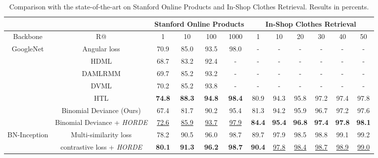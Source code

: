 \documentclass[10pt,twocolumn,letterpaper]{article}
\def\ourmethod{\textit{HORDE}}
\begin{document}
    \setlength{\tabcolsep}{7pt}
    \begin{table*}[t!]
        \footnotesize
        \begin{center}
            \begin{tabular}{|c|c|cccc|cccccc|}\hline
                 & & \multicolumn{4}{c|}{Stanford Online Products} & \multicolumn{6}{c|}{In-Shop Clothes Retrieval} \\\hline
                Backbone & R@ & 1 & 10 & 100 & 1000 & 1 & 10 & 20 & 30 & 40 & 50 \\\hline
\multirow{7}{*}{GoogleNet} & Angular loss \cite{Wang_2017_ICCV} & 70.9 & 85.0 & 93.5 & 98.0 & - & - & - & - & - & - \\
                & HDML \cite{Zheng_2019_CVPR} & 68.7 & 83.2 & 92.4 & - & - & - & - & - & - & - \\
                & DAMLRMM \cite{Xu_2019_CVPR} & 69.7 & 85.2 & 93.2 & - & - & - & - & - & - & - \\
                & DVML \cite{Lin_2018_ECCV} & 70.2 & 85.2 & 93.8 & - & - & - & - & - & - & - \\
& HTL \cite{Ge_2018_ECCV} & \textbf{74.8} & \textbf{88.3} & \textbf{94.8} & \textbf{98.4} & 80.9 & 94.3 & 95.8 & 97.2 & 97.4 & 97.8\\
                \cline{2-12}
& Binomial Deviance (Ours) & 67.4 & 81.7 & 90.2 & 95.4 & 81.3 & 94.2 & 95.9 & 96.7 & 97.2 & 97.6 \\
                & Binomial Deviance + \ourmethod & \underline{72.6} & \underline{85.9} & \underline{93.7} & \underline{97.9} & \textbf{84.4} & \textbf{95.4} & \textbf{96.8} & \textbf{97.4} & \textbf{97.8} & \textbf{98.1} \\
                \hline
                \multirow{2}{*}{BN-Inception} & Multi-similarity loss \cite{Wang_2019_CVPR} & 78.2 & 90.5 & 96.0 & 98.7 & 89.7 & 97.9 & 98.5 & 98.8 & 99.1 & 99.2 \\
                \cline{2-12}
                & contrastive loss + \ourmethod & \textbf{80.1} & \textbf{91.3} & \textbf{96.2} & \textbf{98.7}& \textbf{90.4} & \underline{97.8} & \underline{98.4} & \underline{98.7} & \underline{98.9} & \underline{99.0} \\
                \hline
            \end{tabular}
            \caption{Comparison with the state-of-the-art on Stanford Online Products and In-Shop Clothes Retrieval. Results in percents.}
            \label{tab:SOP-INSHOP}
        \end{center}
        \vspace{-1.5em}
    \end{table*} 
\end{document}
